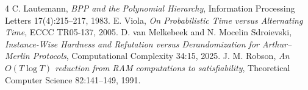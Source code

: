 \documentclass[11pt]{article}
\begin{document}
\begin{thebibliography}{4}
 C. Lautemann, \emph{BPP and the Polynomial Hierarchy}, Information Processing Letters 17(4):215--217, 1983.
 E. Viola, \emph{On Probabilistic Time versus Alternating Time}, ECCC TR05-137, 2005.
 D. van Melkebeek and N. Mocelin Sdroievski, \emph{Instance-Wise Hardness and Refutation versus Derandomization for Arthur--Merlin Protocols}, Computational Complexity 34:15, 2025.
 J. M. Robson, \emph{An $O(T\log T)$ reduction from RAM computations to satisfiability}, Theoretical Computer Science 82:141--149, 1991.
\end{thebibliography}
\end{document}
